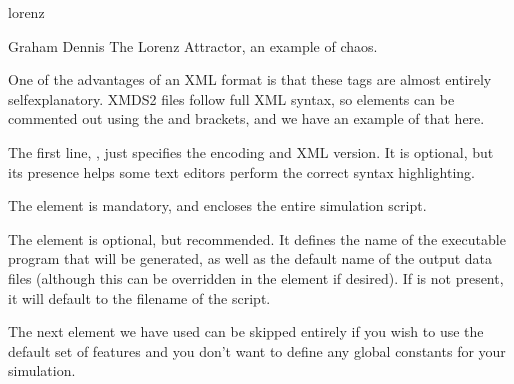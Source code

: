 \documentclass[letterpaper,10pt,english]{sphinxmanual}
\begin{document}
\begin{sphinxVerbatim}[commandchars=\\\{\}]
 
  lorenz

  Graham Dennis
    The Lorenz Attractor, an example of chaos.
\end{sphinxVerbatim}

\sphinxAtStartPar
One of the advantages of an XML format is that these tags are almost entirely self\sphinxhyphen{}explanatory.  XMDS2 files follow full XML syntax, so elements can be commented out using the \sphinxcode{\sphinxupquote{\textless{}!\sphinxhyphen{}\sphinxhyphen{}}} and \sphinxcode{\sphinxupquote{\sphinxhyphen{}\sphinxhyphen{}\textgreater{}}} brackets, and we have an example of that here.

\sphinxAtStartPar
The first line, , just specifies the encoding and XML version. It is optional, but its presence helps some text editors perform the correct syntax highlighting.

\sphinxAtStartPar
The  element is mandatory, and encloses the entire simulation script.

\sphinxAtStartPar
The  element is optional, but recommended. It defines the name of the executable program that will be generated, as well as the default name of the output data files (although this can be over\sphinxhyphen{}ridden in the  element if desired). If  is not present, it will default to the filename of the script.

\sphinxAtStartPar
The next element we have used can be skipped entirely if you wish to use the default set of features and you don’t want to define any global constants for your simulation.
\end{document}
